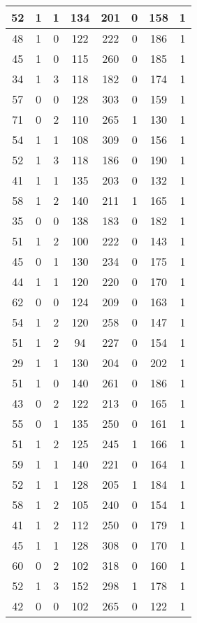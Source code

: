 \documentclass{article}
\begin{document}
\begin{longtable}{|c|c|c|c|c|c|c|c|}
52 & 1 & 1 & 134 & 201 & 0 & 158 & 1 \\ \hline
48 & 1 & 0 & 122 & 222 & 0 & 186 & 1 \\ \hline
45 & 1 & 0 & 115 & 260 & 0 & 185 & 1 \\ \hline
34 & 1 & 3 & 118 & 182 & 0 & 174 & 1 \\ \hline
57 & 0 & 0 & 128 & 303 & 0 & 159 & 1 \\ \hline
71 & 0 & 2 & 110 & 265 & 1 & 130 & 1 \\ \hline
54 & 1 & 1 & 108 & 309 & 0 & 156 & 1 \\ \hline
52 & 1 & 3 & 118 & 186 & 0 & 190 & 1 \\ \hline
41 & 1 & 1 & 135 & 203 & 0 & 132 & 1 \\ \hline
58 & 1 & 2 & 140 & 211 & 1 & 165 & 1 \\ \hline
35 & 0 & 0 & 138 & 183 & 0 & 182 & 1 \\ \hline
51 & 1 & 2 & 100 & 222 & 0 & 143 & 1 \\ \hline
45 & 0 & 1 & 130 & 234 & 0 & 175 & 1 \\ \hline
44 & 1 & 1 & 120 & 220 & 0 & 170 & 1 \\ \hline
62 & 0 & 0 & 124 & 209 & 0 & 163 & 1 \\ \hline
54 & 1 & 2 & 120 & 258 & 0 & 147 & 1 \\ \hline
51 & 1 & 2 & 94 & 227 & 0 & 154 & 1 \\ \hline
29 & 1 & 1 & 130 & 204 & 0 & 202 & 1 \\ \hline
51 & 1 & 0 & 140 & 261 & 0 & 186 & 1 \\ \hline
43 & 0 & 2 & 122 & 213 & 0 & 165 & 1 \\ \hline
55 & 0 & 1 & 135 & 250 & 0 & 161 & 1 \\ \hline
51 & 1 & 2 & 125 & 245 & 1 & 166 & 1 \\ \hline
59 & 1 & 1 & 140 & 221 & 0 & 164 & 1 \\ \hline
52 & 1 & 1 & 128 & 205 & 1 & 184 & 1 \\ \hline
58 & 1 & 2 & 105 & 240 & 0 & 154 & 1 \\ \hline
41 & 1 & 2 & 112 & 250 & 0 & 179 & 1 \\ \hline
45 & 1 & 1 & 128 & 308 & 0 & 170 & 1 \\ \hline
60 & 0 & 2 & 102 & 318 & 0 & 160 & 1 \\ \hline
52 & 1 & 3 & 152 & 298 & 1 & 178 & 1 \\ \hline
42 & 0 & 0 & 102 & 265 & 0 & 122 & 1 \\ \hline

\end{longtable}
\end{document}
